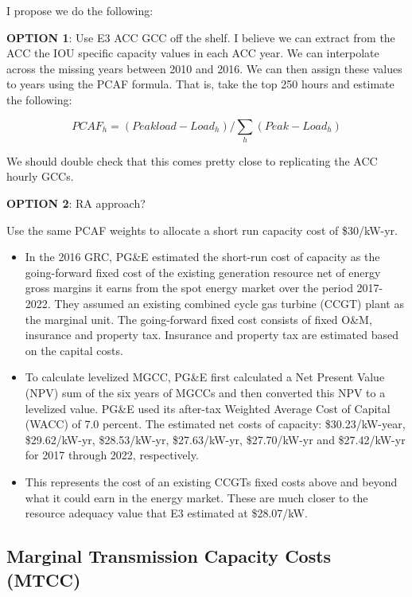 \documentclass[11pt]{article}
\begin{document}
I propose we do the following:


\textbf{OPTION 1}: Use E3 ACC GCC off the shelf.  I believe we can extract from the ACC the IOU specific capacity values in each ACC year. We can interpolate across the missing years between 2010 and 2016. We can then assign these values to years using the PCAF formula. That is, take the top 250 hours and estimate the following:

\begin{equation*}
PCAF_h =  ( Peak load - Load_h) / \sum_h (Peak-Load_h)
\end{equation*}

We should double check that this comes pretty close to replicating the ACC hourly GCCs.

\textbf{OPTION 2}: RA approach? 

Use the same PCAF weights to allocate a short run capacity cost of \$30/kW-yr.

\begin{itemize}

\item 	In the 2016 GRC, PG&E estimated the short-run cost of capacity as the going-forward fixed cost of the existing generation resource net of energy gross margins it earns from the spot energy market over the period  2017-2022.  They assumed an existing combined cycle gas turbine (CCGT) plant as the marginal unit. The going-forward fixed cost consists of fixed O&M, insurance and property tax. Insurance and property tax are estimated based on the capital costs.  

\item 	To calculate levelized MGCC, PG&E first calculated a Net Present Value (NPV) sum of the six years of MGCCs and then converted this NPV to a levelized value. PG&E used its after-tax Weighted Average Cost of Capital (WACC) of 7.0 percent. The estimated net costs of capacity:  \$30.23/kW-year, \$29.62/kW-yr, \$28.53/kW-yr, \$27.63/kW-yr, \$27.70/kW-yr and \$27.42/kW-yr for 2017 through 2022, respectively. 

\item 	This represents the cost of an existing CCGTs fixed costs above and beyond what it could earn in the energy market. These are much closer to the resource adequacy value that E3 estimated at \$28.07/kW. 

\end{itemize}


\subsection{Marginal Transmission Capacity Costs (MTCC) }
\end{document}
